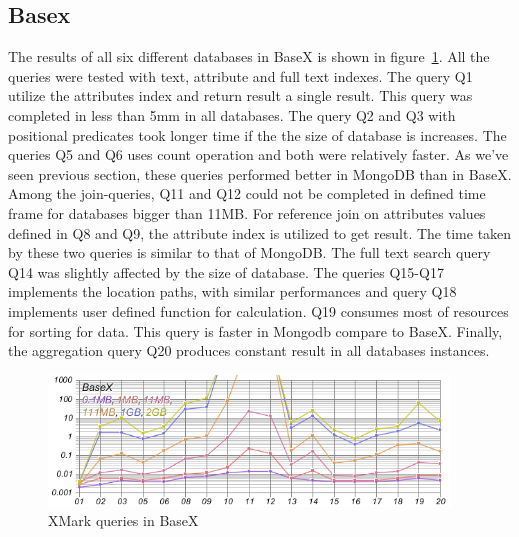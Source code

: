 \subsection{Basex}
The results of all six different databases in BaseX is shown in figure~\ref{fig:xmark-result-basex-all}. All the queries were tested with text, attribute and full text indexes. The query Q1 utilize the attributes index and return result a single result. This query was completed in less than 5mm in all databases. The query Q2 and Q3  with positional predicates took longer time if the the size of database is increases. The queries Q5 and Q6 uses count operation and both were relatively faster. As we've seen previous section, these queries performed better in MongoDB than in BaseX. Among the join-queries,  Q11 and Q12 could not be completed in defined time frame for databases bigger than 11MB. For reference join on attributes values defined in Q8 and Q9, the attribute index is utilized to get result. The time taken by these two queries is  similar to that of MongoDB.  The full text search query Q14 was slightly affected by the size of database. The queries Q15-Q17 implements the location paths, with similar performances and query Q18  implements user defined function for calculation. Q19 consumes most of resources for sorting for data. This query is faster in Mongodb compare to BaseX. Finally, the aggregation query Q20 produces constant result in all databases instances. 
\begin{figure}
	\centering
	\includegraphics[width=0.95\textwidth]{img/result/basex/basex-all}
	\caption{XMark queries in BaseX}
	\label{fig:xmark-result-basex-all}
\end{figure}


